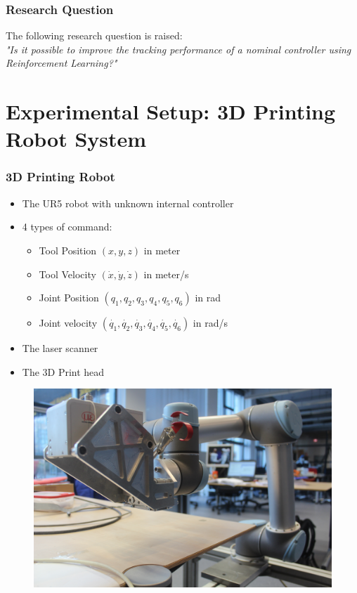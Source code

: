 \documentclass{beamer}
\begin{document}
	\begin{frame}\frametitle{Research Question}
		The following research question is raised: \\
		\vspace{5mm}
		\hspace{5mm} \textit{"Is it possible to improve the tracking performance of a nominal controller using Reinforcement Learning?"}
	\end{frame}
			
	\section{Experimental Setup: 3D Printing Robot System}
	\begin{frame}\frametitle{3D Printing Robot}
		\vspace{2mm}
		\fontsize{9}{4}\selectfont 
		\begin{itemize}
			\item The UR5 robot with unknown internal controller
			\item 4 types of command:
			\begin{itemize} \fontsize{8}{4}\selectfont  
				\item Tool Position $ (x, y, z) $ in meter \vspace{0.5mm}
				\item Tool Velocity $ (\dot{x}, \dot{y}, \dot{z}) $ in meter/s \vspace{0.5mm}
				\item Joint Position $ (q_1, q_2, q_3 , q_4, q_5, q_6)$ in rad \vspace{0.5mm}
				\item Joint velocity $ (\dot{q_1}, \dot{q_2}, \dot{q_3} , \dot{q_4}, \dot{q_5}, \dot{q_6})$ in rad/s
			\end{itemize} \vspace{1mm}
			\item The laser scanner \vspace{1mm}
			\item The 3D Print head					
		\end{itemize}
		\pause
		\begin{figure}
		\centering
		\includegraphics[width=0.53\linewidth]{images/IMG_9011}
		\caption{}
		\label{fig:IMG_9011}
		\end{figure}
	\end{frame}
\end{document}
